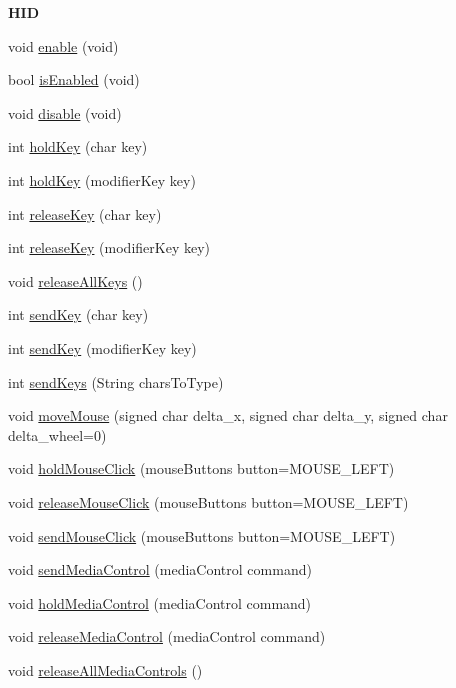 \begin{Indent}{\bf H\+I\+D}
\begin{DoxyCompactItemize}
\item 
void \hyperlink{class_bean_hid___abc7bfa1befc35668b656dabc3d8646fa}{enable} (void)
\item 
bool \hyperlink{class_bean_hid___a5ddd3768219028dcee875f94855837a4}{is\+Enabled} (void)
\item 
void \hyperlink{class_bean_hid___a90eaa0e5ab96bd8e4220c4e4daa75dde}{disable} (void)
\item 
int \hyperlink{class_bean_hid___aad9dd7f6967d211abb6edb618c80e1a9}{hold\+Key} (char key)
\item 
int \hyperlink{class_bean_hid___a40083ffe2f60453c9988419b083a26ad}{hold\+Key} (modifier\+Key key)
\item 
int \hyperlink{class_bean_hid___ad0bdfc47ceedf67a923fa378048e7d2e}{release\+Key} (char key)
\item 
int \hyperlink{class_bean_hid___a41d8c234073789bcff992387f4398cac}{release\+Key} (modifier\+Key key)
\item 
void \hyperlink{class_bean_hid___a5f2464de95903311d251b9b92f5460cf}{release\+All\+Keys} ()
\item 
int \hyperlink{class_bean_hid___acf1c04f167558c6d9c11c40e1a2d1cf7}{send\+Key} (char key)
\item 
int \hyperlink{class_bean_hid___abe48bfbb4e86e3e6411ebe507e388543}{send\+Key} (modifier\+Key key)
\item 
int \hyperlink{class_bean_hid___a9421d40df77b9d1f18d5a202879063ee}{send\+Keys} (String chars\+To\+Type)
\item 
void \hyperlink{class_bean_hid___a8d40fc0c1a14803b5ebc472f5d34b4c0}{move\+Mouse} (signed char delta\+\_\+x, signed char delta\+\_\+y, signed char delta\+\_\+wheel=0)
\item 
void \hyperlink{class_bean_hid___aab7466efc670230ce1f2694047eaa1d2}{hold\+Mouse\+Click} (mouse\+Buttons button=M\+O\+U\+S\+E\+\_\+\+L\+E\+F\+T)
\item 
void \hyperlink{class_bean_hid___accdc853cab0d52bd30d68f153e3f7f29}{release\+Mouse\+Click} (mouse\+Buttons button=M\+O\+U\+S\+E\+\_\+\+L\+E\+F\+T)
\item 
void \hyperlink{class_bean_hid___a6568d01038b06a24afd93d5366ef9b00}{send\+Mouse\+Click} (mouse\+Buttons button=M\+O\+U\+S\+E\+\_\+\+L\+E\+F\+T)
\item 
void \hyperlink{class_bean_hid___a4fce5e764a70052ee85919f22ec04f4f}{send\+Media\+Control} (media\+Control command)
\item 
void \hyperlink{class_bean_hid___af9919a1a3942fbe2bc3cfa34e1fe4f04}{hold\+Media\+Control} (media\+Control command)
\item 
void \hyperlink{class_bean_hid___a3cb98f00d25098d7f45196d63eb92925}{release\+Media\+Control} (media\+Control command)
\item 
void \hyperlink{class_bean_hid___a574a50368c284d3db59fba546f542538}{release\+All\+Media\+Controls} ()
\end{DoxyCompactItemize}
\end{Indent}


